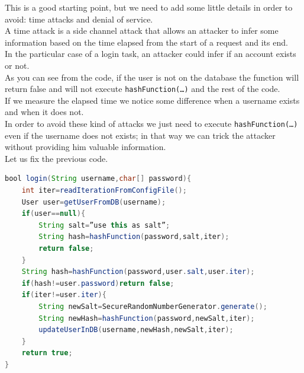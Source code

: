 This is a good starting point, but we need to add some little details in order to avoid: time attacks and denial of service.\\
A time attack is a side channel attack that allows an attacker to infer some information based on the time elapsed from the start of a request and its end.\\
In the particular case of a login task, an attacker could infer if an account exists or not.\\
As you can see from the code, if the user is not on the database the function will return false and will not execute \texttt{hashFunction(…)} and the rest of the code.\\
If we measure the elapsed time we notice some difference when a username exists and when it does not.\\
In order to avoid these kind of attacks we just need to execute \texttt{hashFunction(…)} even if the username does not exists; in that way we can trick the attacker without providing him valuable information.\\
Let us fix the previous code.\\
\begin{lstlisting}[language=Java]
bool login(String username,char[] password){
	int iter=readIterationFromConfigFile();
	User user=getUserFromDB(username);
	if(user==null){
		String salt=”use this as salt”;
		String hash=hashFunction(password,salt,iter);
		return false;
	}
	String hash=hashFunction(password,user.salt,user.iter);
	if(hash!=user.password)return false;
	if(iter!=user.iter){
		String newSalt=SecureRandomNumberGenerator.generate();
		String newHash=hashFunction(password,newSalt,iter);
		updateUserInDB(username,newHash,newSalt,iter);
	}
	return true;
}
\end{lstlisting}

